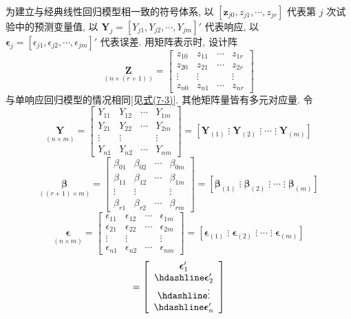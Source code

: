 
为建立与经典线性回归模型相一致的符号体系, 以 $[\mathbf{z}_{j0},z_{j1},\cdots,z_{jr}]$ 代表第 $j$ 次试验中的预测变量值, 以 $\mathbf{Y}_j=[Y_{j1},Y_{j2},\cdots,Y_{jm}]'$ 代表响应, 以 $\boldsymbol{\epsilon}_j=[\epsilon_{j1},\epsilon_{j2},\cdots,\epsilon_{jm}]'$ 代表误差. 用矩阵表示时, 设计阵
\[
\underset{(n\times(r+1))}{\mathbf{Z}}=\begin{bmatrix}z_{10}&z_{11}&\cdots&z_{1r}\\z_{20}&z_{21}&\cdots&z_{2r}\\\vdots&\vdots&&\vdots\\z_{n0}&z_{n1}&\cdots&z_{nr}\end{bmatrix}
\]
与单响应回归模型的情况相同[见\hyperref[eq:7-3]{式(7-3)}]. 其他矩阵量皆有多元对应量. 令
\[
\underset{(n\times m)}{\mathbf{Y}}=\begin{bmatrix}Y_{11}&Y_{12}&\cdots&Y_{1m}\\Y_{21}&Y_{22}&\cdots&Y_{2m}\\\vdots&\vdots&&\vdots\\Y_{n1}&Y_{n2}&\cdots&Y_{nm}\end{bmatrix}=\left[\mathbf{Y}_{(1)}\;\vdots\;\mathbf{Y}_{(2)}\;\vdots\;\cdots\;\vdots\;\mathbf{Y}_{(m)}\right]
\]
\[
\underset{((r+1)\times m)}{\boldsymbol{\beta}}=\begin{bmatrix}\beta_{01}&\beta_{02}&\cdots&\beta_{0m}\\\beta_{11}&\beta_{12}&\cdots&\beta_{1m}\\\vdots&\vdots&&\vdots\\\beta_{r1}&\beta_{r2}&\cdots&\beta_{rm}\end{bmatrix}=\left[\boldsymbol{\beta}_{(1)}\;\vdots\;\boldsymbol{\beta}_{(2)}\;\vdots\;\cdots\;\vdots\;\boldsymbol{\beta}_{(m)}\right]
\]
\[
\underset{(n\times m)}{\boldsymbol{\epsilon}}=\begin{bmatrix}\epsilon_{11}&\epsilon_{12}&\cdots&\epsilon_{1m}\\\epsilon_{21}&\epsilon_{22}&\cdots&\epsilon_{2m}\\\vdots&\vdots&&\vdots\\\epsilon_{n1}&\epsilon_{n2}&\cdots&\epsilon_{nm}\end{bmatrix}=\left[\boldsymbol{\epsilon}_{(1)}\;\vdots\;\boldsymbol{\epsilon}_{(2)}\;\vdots\;\cdots\;\vdots\;\boldsymbol{\epsilon}_{(m)}\right]
\]
\[
=\left[\begin{array}{c}\boldsymbol{\epsilon}_1'\\\hdashline\boldsymbol{\epsilon}_2'\\\hdashline\vdots\\\hdashline\boldsymbol{\epsilon}_n'\end{array}\right]
\]

